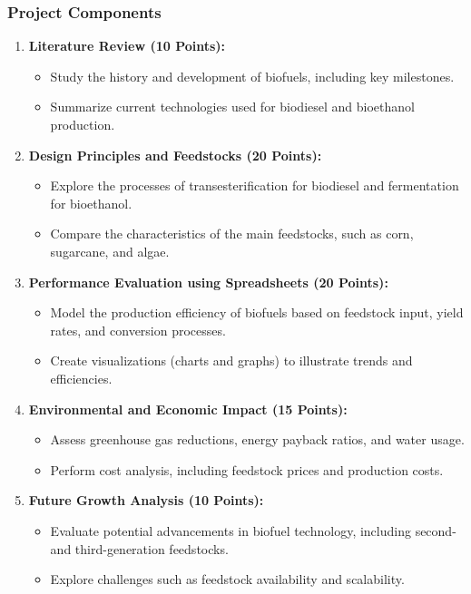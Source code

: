 \documentclass[11pt]{article}
\begin{document}
\subsubsection*{Project Components}
\begin{enumerate}
    \item \textbf{Literature Review (10 Points):}
    \begin{itemize}
        \item Study the history and development of biofuels, including key milestones.
        \item Summarize current technologies used for biodiesel and bioethanol production.
    \end{itemize}

    \item \textbf{Design Principles and Feedstocks (20 Points):}
    \begin{itemize}
        \item Explore the processes of transesterification for biodiesel and fermentation for bioethanol.
        \item Compare the characteristics of the main feedstocks, such as corn, sugarcane, and algae.
    \end{itemize}

    \item \textbf{Performance Evaluation using Spreadsheets (20 Points):}
    \begin{itemize}
        \item Model the production efficiency of biofuels based on feedstock input, yield rates, and conversion processes.
        \item Create visualizations (charts and graphs) to illustrate trends and efficiencies.
    \end{itemize}

    \item \textbf{Environmental and Economic Impact (15 Points):}
    \begin{itemize}
        \item Assess greenhouse gas reductions, energy payback ratios, and water usage.
        \item Perform cost analysis, including feedstock prices and production costs.
    \end{itemize}

    \item \textbf{Future Growth Analysis (10 Points):}
    \begin{itemize}
        \item Evaluate potential advancements in biofuel technology, including second- and third-generation feedstocks.
        \item Explore challenges such as feedstock availability and scalability.
    \end{itemize}


\end{enumerate}
\end{document}
